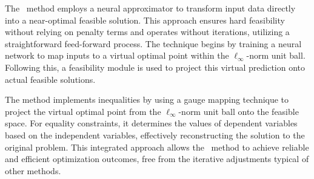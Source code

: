 

The \LOOPLC~method employs a neural approximator to transform input data directly into a near-optimal feasible solution. This approach ensures hard feasibility without relying on penalty terms and operates without iterations, utilizing a straightforward feed-forward process. The technique begins by training a neural network to map inputs to a virtual optimal point within the $\ell_\infty$-norm unit ball. Following this, a feasibility module is used to project this virtual prediction onto actual feasible solutions.

The method implements inequalities by using a gauge mapping technique to project the virtual optimal point from the \(\ell_\infty\)-norm unit ball onto the feasible space. For equality constraints, it determines the values of dependent variables based on the independent variables, effectively reconstructing the solution to the original problem. This integrated approach allows the \LOOPLC~method to achieve reliable and efficient optimization outcomes, free from the iterative adjustments typical of other methods.

